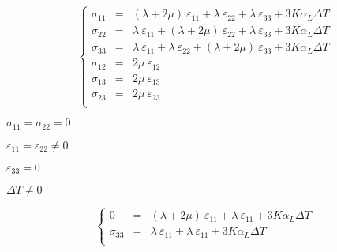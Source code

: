 \documentclass[onecolumn,11pt]{report}
\def\lthtmlcheckvsize{\ifdim\ht\sizebox<\vsize 
  \ifdim\wd\sizebox<\hsize\expandafter\hfill\fi \expandafter\vfill
  \else\expandafter\vss\fi}%
\begin{document}
{\newpage\clearpage
{}%
\begin{displaymath}\left\lbrace
\begin{array}{rcl}
\sigma_{11} & = & (\lambda + 2 \mu) \: \varepsilon_{11} + \lambda \: \varepsilon_{22} + \lambda \: \varepsilon_{33} + 3 K \alpha_L \Delta T \\
\sigma_{22} & = & \lambda \: \varepsilon_{11} + (\lambda + 2 \mu) \: \varepsilon_{22} + \lambda \: \varepsilon_{33} + 3 K \alpha_L \Delta T \\
\sigma_{33} & = & \lambda \: \varepsilon_{11} + \lambda \: \varepsilon_{22} + (\lambda + 2 \mu) \: \varepsilon_{33} + 3 K \alpha_L \Delta T \\
\sigma_{12} & = & 2 \mu \: \varepsilon_{12}\\
\sigma_{13} & = & 2 \mu \: \varepsilon_{13}\\
\sigma_{23} & = & 2 \mu \: \varepsilon_{23}\\
\end{array}
\right.\end{displaymath}%
\lthtmldisplayZ
\lthtmlcheckvsize\clearpage}

{\newpage\clearpage
{}%
$ \sigma_{11}=\sigma_{22}=0$%
\lthtmlindisplaymathZ
\lthtmlcheckvsize\clearpage}

{\newpage\clearpage
{}%
$ \varepsilon_{11}=\varepsilon_{22} \neq 0$%
\lthtmlindisplaymathZ
\lthtmlcheckvsize\clearpage}

{\newpage\clearpage
{}%
$ \varepsilon_{33}=0$%
\lthtmlindisplaymathZ
\lthtmlcheckvsize\clearpage}

{\newpage\clearpage
{}%
$ \Delta T \neq 0$%
\lthtmlindisplaymathZ
\lthtmlcheckvsize\clearpage}

{\newpage\clearpage
{}%
\begin{displaymath}\left\lbrace
\begin{array}{rcl}
0 & = & (\lambda + 2 \mu) \: \varepsilon_{11} + \lambda \: \varepsilon_{11} + 3 K \alpha_L \Delta T\\
\sigma_{33} & = & \lambda \: \varepsilon_{11} + \lambda \: \varepsilon_{11} + 3 K \alpha_L \Delta T \\
\end{array}
\right.\end{displaymath}%
\lthtmldisplayZ
\lthtmlcheckvsize\clearpage}
\end{document}
